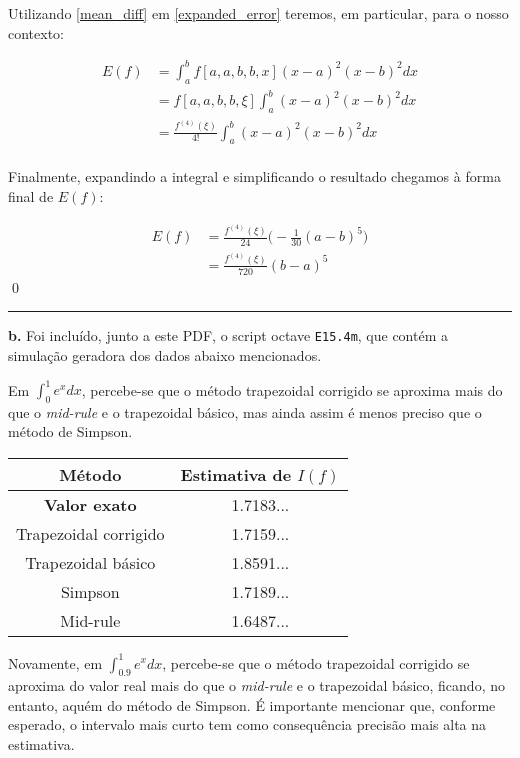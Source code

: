 \documentclass[11pt]{amsart}
\begin{document}
\bigskip
Utilizando \eqref{mean_diff} em \eqref{expanded_error} teremos, em particular, para o nosso contexto:

\begin{align*}
    E(f) &= \int_a^b f[a, a, b, b, x] (x-a)^2(x-b)^2 dx\\
         &= f[a, a, b, b, \xi] \int_a^b (x-a)^2(x-b)^2 dx\\
         &= \frac{f^{(4)}(\xi)}{4!} \int_a^b (x-a)^2(x-b)^2 dx\\
\end{align*}

\bigskip
Finalmente, expandindo a integral e simplificando o resultado chegamos à forma final de $E(f)$:

\begin{align*}
    E(f) &= \frac{f^{(4)}(\xi)}{24} \Big(-\frac{1}{30}(a-b)^5\Big)\\
         &= \frac{f^{(4)}(\xi)}{720} (b-a)^5
\end{align*}
\qed\null

\bigskip
\bigskip
\rule{\textwidth}{0.4pt}
\textbf{b.}
Foi incluído, junto a este PDF, o script octave \verb|E15.4m|, que contém a simulação geradora dos dados abaixo mencionados.

\bigskip
Em $\int_0^1 e^x dx$, percebe-se que o método trapezoidal corrigido se aproxima mais do que o \textit{mid-rule} e o trapezoidal básico, mas ainda assim é menos preciso que o método de Simpson.

\bigskip
\begin{center}
    \begin{tabular}{c|c}
        \hline
        Método & Estimativa de $I(f)$ \\
        \hline
        \textbf{Valor exato} & 1.7183...\\
        Trapezoidal corrigido & 1.7159...\\
        Trapezoidal básico& 1.8591... \\
        Simpson & 1.7189... \\
        Mid-rule & 1.6487... \\
        \hline
    \end{tabular}
\end{center}

\bigskip
\bigskip
Novamente, em $\int_0.9^1 e^x dx$, percebe-se que o método trapezoidal corrigido se aproxima do valor real mais do que o \textit{mid-rule} e o trapezoidal básico, ficando, no entanto, aquém do método de Simpson. É importante mencionar que, conforme esperado, o intervalo mais curto tem como consequência precisão mais alta na estimativa.
\end{document}
